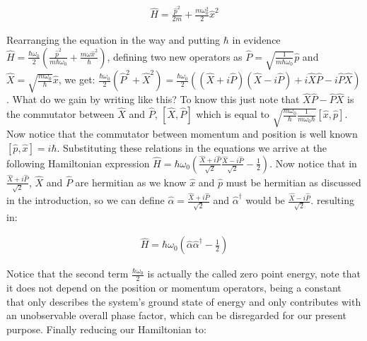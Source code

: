 \documentclass[
  journal=largetwo,
  year=2023,
]{cup-journal}
\begin{document}
\begin{equation}
  \begin{aligned}\label{eq:9}
    \hat{H} = \frac{\hat{p}^2}{2m} + \frac{m\omega_0^{2}}{2}\hat{x}^2
  \end{aligned}
\end{equation}


Rearranging the equation in the way and putting \(\hbar\) in evidence \(\hat{H} = \frac{\hbar\omega_0}{2}(\frac{\hat{p}^2}{m\hbar\omega_0} + \frac{m\omega\hat{x}^2}{\hbar})\), defining two new operators as \(\hat{P} = \sqrt{\frac{1}{m\hbar\omega_0}}\hat{p}\)  and \(\hat{X} = \sqrt{\frac{m\omega_0}{\hbar}}\hat{x}\), we get: \(\frac{\hbar\omega_0}{2}(\hat{P}^2 + \hat{X}^2) = \frac{\hbar\omega_0}{2}((\hat{X} + i\hat{P})(\hat{X} - i\hat{P}) + i\hat{X}\hat{P} - i\hat{P}\hat{X})\). What do we gain by writing like this? To know this just note that \(\hat{X}\hat{P} - \hat{P}\hat{X}\) is the commutator between \(\hat{X}\) and \(\hat{P}\), \([\hat{X}, \hat{P}]\) which is equal to \(\sqrt{\frac{m\omega_0}{\hbar}\frac{1}{m\omega_0\hbar}}[\hat{x}, \hat{p}]\). Now notice that the commutator between momentum and position is well known \([\hat{p}, \hat{x}] = i\hbar \). Substituting these relations in the equations we arrive at the following Hamiltonian expression \(\hat{H} = \hbar\omega_0(\frac{\hat{X} + i\hat{P}}{\sqrt{2}}\frac{\hat{X}-i\hat{P}}{\sqrt{2}} - \frac{1}{2})\). Now notice that in \(\frac{\hat{X} + i\hat{P}}{\sqrt{2}}\), \(\hat{X}\)  and \(\hat{P}\) are hermitian as we know \(\hat{x}\) and \(\hat{p}\) must be hermitian as discussed in the introduction, so we can define \(\hat{\alpha} = \frac{\hat{X} + i\hat{P}}{\sqrt{2}}\) and \(\hat{\alpha}^{\dag}\) would be \(\frac{\hat{X} - i\hat{P}}{\sqrt{2}}\). resulting in:

\begin{equation}
  \begin{aligned}\label{eq:10}
    \hat{H} = \hbar\omega_0(\hat{\alpha}\hat{\alpha}^{\dag} - \frac{1}{2})
  \end{aligned}
\end{equation}


Notice that the second term $\frac{\hbar\omega_0}{2}$ is actually the called zero point energy, note that it does not depend on the position or momentum operators, being a constant that only describes the system's ground state of energy and only contributes with an unobservable overall phase factor, which can be disregarded for our present purpose. Finally reducing our Hamiltonian to:
\end{document}
